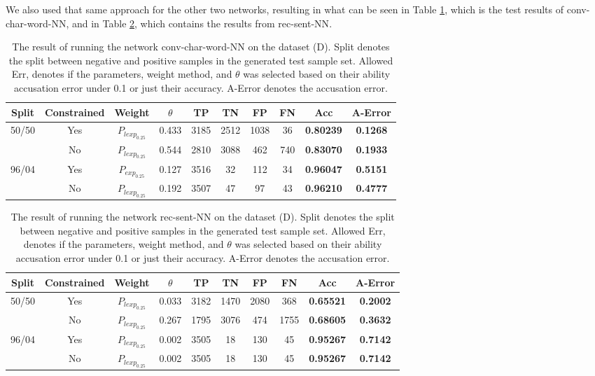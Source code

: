 We also used that same approach for the other two networks, resulting in what
can be seen in Table \ref{tab:char_word_CNN_res}, which is the test results of
\gls{conv-char-word-NN}, and in Table \ref{tab:RNN_res}, which contains the
results from \gls{rec-sent-NN}.

\begin{table}[]
\begin{tabular}{|c|c|c|c|c|c|c|c||c|c|}
\hline
Split & Constrained & Weight & $\theta$ & TP & TN & FP & FN & \textbf{Acc} & \textbf{A-Error} \\ \hline
\multirow{2}{*}{50/50} & Yes & $P_{lexp_{0.25}}$ & 0.433 & 3185 & 2512 & 1038 & 36 & \textbf{0.80239} & \textbf{0.1268} \\ \cline{2-10} 
 & No & $P_{lexp_{0.25}}$ & 0.544 & 2810 & 3088 & 462 & 740 & \textbf{0.83070} & \textbf{0.1933} \\ \hline
\multirow{2}{*}{96/04} & Yes & $P_{exp_{0.25}}$ & 0.127 & 3516 & 32 & 112 & 34 & \textbf{0.96047} & \textbf{0.5151} \\ \cline{2-10} 
 & No & $P_{lexp_{0.25}}$ & 0.192 & 3507 & 47 & 97 & 43 & \textbf{0.96210} & \textbf{0.4777} \\ \hline
\end{tabular}
\caption{The result of running the network \gls{conv-char-word-NN} on the
dataset (D). Split denotes the split between negative and positive samples in
the generated test sample set. Allowed Err, denotes if the parameters, weight
method, and $\theta$ was selected based on their ability accusation error under
0.1 or just their accuracy. A-Error denotes the accusation error.}
\label{tab:char_word_CNN_res}
\end{table}

\begin{table}[]
\begin{tabular}{|c|c|c|c|c|c|c|c||c|c|}
\hline
Split & Constrained & Weight & $\theta$ & TP & TN & FP & FN & \textbf{Acc} & \textbf{A-Error} \\ \hline
\multirow{2}{*}{50/50} & Yes & $P_{lexp_{0.25}}$ & 0.033 & 3182 & 1470 & 2080 & 368 & \textbf{0.65521} & \textbf{0.2002} \\ \cline{2-10} 
 & No & $P_{lexp_{0.25}}$ & 0.267 & 1795 & 3076 & 474 & 1755 & \textbf{0.68605} & \textbf{0.3632} \\ \hline
\multirow{2}{*}{96/04} & Yes & $P_{lexp_{0.25}}$ & 0.002 & 3505 & 18 & 130 & 45 & \textbf{0.95267} & \textbf{0.7142} \\ \cline{2-10} 
 & No & $P_{lexp_{0.25}}$ & 0.002 & 3505 & 18 & 130 & 45 & \textbf{0.95267} & \textbf{0.7142} \\ \hline
\end{tabular}
\caption{The result of running the network \gls{rec-sent-NN} on the
dataset (D). Split denotes the split between negative and positive samples in
the generated test sample set. Allowed Err, denotes if the parameters, weight
method, and $\theta$ was selected based on their ability accusation error under
0.1 or just their accuracy. A-Error denotes the accusation error.}
\label{tab:RNN_res}
\end{table}


